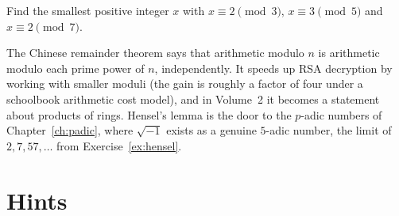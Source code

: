 \begin{exercise}[$\star$]\label{ex:t1-sunzi23}
Find the smallest positive integer $x$ with $x\equiv 2\pmod 3$, $x\equiv 3\pmod 5$ and $x\equiv 2\pmod 7$.
\end{exercise}

\begin{beauty}
The Chinese remainder theorem says that arithmetic modulo $n$ is arithmetic modulo each prime power of $n$, independently. It speeds up RSA decryption by working with smaller moduli (the gain is roughly a factor of four under a schoolbook arithmetic cost model), and in Volume~2 it becomes a statement about products of rings. Hensel's lemma is the door to the $p$-adic numbers of Chapter~\ref{ch:padic}, where $\sqrt{-1}$ exists as a genuine $5$-adic number, the limit of $2,7,57,\dots$ from Exercise~\ref{ex:hensel}.
\end{beauty}

\section{Hints}

